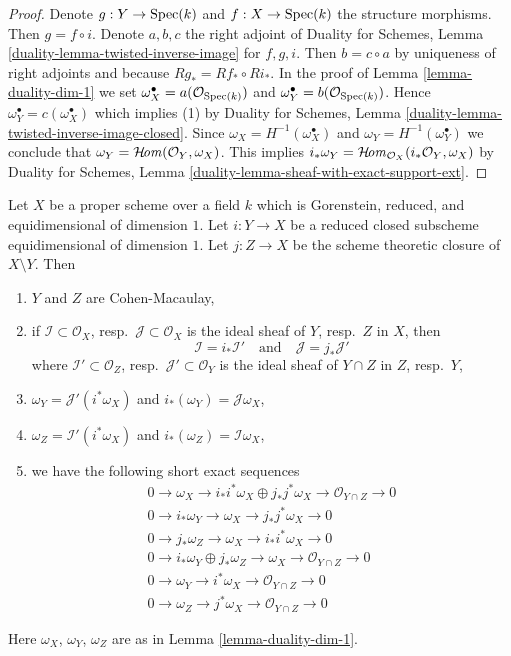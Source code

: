 \begin{proof}
Denote $g : Y \to \mathop{\mathrm{Spec}}(k)$ and $f : X \to \mathop{\mathrm{Spec}}(k)$ the structure morphisms.
Then $g = f \circ i$. Denote $a, b, c$ the right adjoint of
Duality for Schemes, Lemma
\ref{duality-lemma-twisted-inverse-image} for $f, g, i$.
Then $b = c \circ a$ by uniqueness of right adjoints
and because $Rg_* = Rf_* \circ Ri_*$.
In the proof of Lemma \ref{lemma-duality-dim-1}
we set
$\omega_X^\bullet = a(\mathcal{O}_{\mathop{\mathrm{Spec}}(k)})$ and
$\omega_Y^\bullet = b(\mathcal{O}_{\mathop{\mathrm{Spec}}(k)})$.
Hence $\omega_Y^\bullet = c(\omega_X^\bullet)$
which implies (1) by Duality for Schemes, Lemma
\ref{duality-lemma-twisted-inverse-image-closed}.
Since $\omega_X = H^{-1}(\omega_X^\bullet)$ and
$\omega_Y = H^{-1}(\omega_Y^\bullet)$ we conclude that
$\omega_Y = \mathop{\mathcal{H}\!\mathit{om}}\nolimits(\mathcal{O}_Y, \omega_X)$.
This implies
$i_*\omega_Y = \mathop{\mathcal{H}\!\mathit{om}}\nolimits_{\mathcal{O}_X}(i_*\mathcal{O}_Y, \omega_X)$
by Duality for Schemes, Lemma
\ref{duality-lemma-sheaf-with-exact-support-ext}.
\end{proof}

\begin{lemma}
\label{lemma-closed-subscheme-reduced-gorenstein}
Let $X$ be a proper scheme over a field $k$ which is
Gorenstein, reduced, and equidimensional of dimension $1$.
Let $i : Y \to X$ be a reduced closed subscheme equidimensional
of dimension $1$. Let $j : Z \to X$ be the scheme theoretic
closure of $X \setminus Y$. Then
\begin{enumerate}
\item $Y$ and $Z$ are Cohen-Macaulay,
\item if $\mathcal{I} \subset \mathcal{O}_X$,
resp.\ $\mathcal{J} \subset \mathcal{O}_X$ is the ideal sheaf of
$Y$, resp.\ $Z$ in $X$, then
$$
\mathcal{I} = i_*\mathcal{I}'
\quad\text{and}\quad
\mathcal{J} = j_*\mathcal{J}'
$$
where $\mathcal{I}' \subset \mathcal{O}_Z$,
resp.\ $\mathcal{J}' \subset \mathcal{O}_Y$ is the ideal sheaf
of $Y \cap Z$ in $Z$, resp.\ $Y$,
\item $\omega_Y = \mathcal{J}'(i^*\omega_X)$ and
$i_*(\omega_Y) = \mathcal{J}\omega_X$,
\item $\omega_Z = \mathcal{I}'(i^*\omega_X)$ and
$i_*(\omega_Z) = \mathcal{I}\omega_X$,
\item we have the following short exact sequences
\begin{align*}
0 \to \omega_X \to i_*i^*\omega_X \oplus j_*j^*\omega_X \to
\mathcal{O}_{Y \cap Z} \to 0 \\
0 \to i_*\omega_Y \to \omega_X \to j_*j^*\omega_X \to 0 \\
0 \to j_*\omega_Z \to \omega_X \to i_*i^*\omega_X \to 0 \\
0 \to i_*\omega_Y \oplus j_*\omega_Z \to \omega_X \to
\mathcal{O}_{Y \cap Z} \to 0 \\
0 \to \omega_Y \to i^*\omega_X \to \mathcal{O}_{Y \cap Z} \to 0 \\
0 \to \omega_Z \to j^*\omega_X \to \mathcal{O}_{Y \cap Z} \to 0
\end{align*}
\end{enumerate}
Here $\omega_X$, $\omega_Y$, $\omega_Z$ are as in
Lemma \ref{lemma-duality-dim-1}.
\end{lemma}

